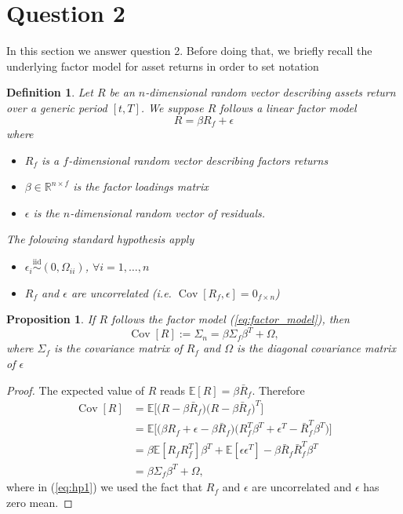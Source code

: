 \documentclass[12pt, a4paper]{article}
\theoremstyle{problemstyle}
\newtheorem{definition}{Definition}[section]
\newtheorem{proposition}{Proposition}[section]
\newcommand{\Cov}[1]{\operatorname{Cov}\left[#1\right]}
\begin{document}
\section{Question 2}
In this section we answer question 2. Before doing that, we briefly recall the underlying factor model for asset returns in order to set notation 

\begin{definition}
	Let $R$ be an $n$-dimensional random vector describing assets return over a generic period $[t, T]$. We suppose $R$ follows a linear factor model 
	\begin{equation}\label{eq:factor_model}
	R = \beta R_f + \epsilon
	\end{equation}
	where
	\begin{itemize}
		\item $R_f$ is a $f$-dimensional random vector describing factors returns
		\item $\beta \in \mathbb{R}^{n \times f}$ is the factor loadings matrix
		\item $\epsilon$ is the $n$-dimensional random vector of residuals.
	\end{itemize}
The folowing standard hypothesis apply
\begin{itemize}
	\item $\epsilon_i \overset{\mathrm{iid}}{\sim} (0, \Omega_{ii})$, $\forall i = 1, \ldots, n$
	\item $R_f$ and $\epsilon$ are uncorrelated (i.e. $\Cov{R_f, \epsilon}=0_{f\times n}$)
\end{itemize}
\end{definition}

\begin{proposition}
	If $R$ follows the factor model (\ref{eq:factor_model}), then 
	\begin{equation}
	\Cov{R}:=\Sigma_n=\beta\Sigma_f \beta^T + \Omega,
	\end{equation}
	where $\Sigma_f$ is the covariance matrix of $R_f$ and $\Omega$ is the diagonal covariance matrix of $\epsilon$
\end{proposition}
\begin{proof}
	The expected value of $R$ reads $\mathbb{E}[R]=\beta \bar{R}_f$. Therefore
	\begin{align}
	\Cov{R} & = \mathbb{E}\Bigg[\Big(R - \beta \bar{R}_f\Big)\Big(R - \beta \bar{R}_f\Big)^T\Bigg] \\
	& = \mathbb{E}\Bigg[\Big(\beta R_f + \epsilon -  \beta \bar{R}_f\Big)\Big(R_f^T\beta^T + \epsilon^T - \bar{R}_f^T\beta^T\Big)\Bigg]\\ \label{eq:hp1}
	& = \beta\mathbb{E}[R_fR_f^T]\beta^T + \mathbb{E}[\epsilon \epsilon^T] - \beta\bar{R}_f\bar{R}_f^T\beta^T\\ \label{eq:hp2}
	& = \beta\Sigma_f \beta^T + \Omega,
	\end{align}
	where in (\ref{eq:hp1}) we used the fact that $R_f$ and $\epsilon$ are uncorrelated and $\epsilon$ has zero mean.
\end{proof}
\end{document}
